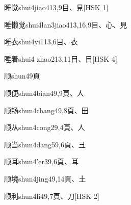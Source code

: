 \begin{entry}{睡觉}{shui4jiao4}{13,9}{⽬、⾒}[HSK 1]
\end{entry}

\begin{entry}{睡懒觉}{shui4lan3jiao4}{13,16,9}{⽬、⼼、⾒}
\end{entry}

\begin{entry}{睡衣}{shui4yi1}{13,6}{⽬、⾐}
\end{entry}

\begin{entry}{睡着}{shui4 zhao2}{13,11}{⽬、⽬}[HSK 4]
\end{entry}

\begin{entry}{顺}{shun4}{9}{⾴}
\end{entry}

\begin{entry}{顺便}{shun4bian4}{9,9}{⾴、⼈}
\end{entry}

\begin{entry}{顺畅}{shun4chang4}{9,8}{⾴、⽥}
\end{entry}

\begin{entry}{顺从}{shun4cong2}{9,4}{⾴、⼈}
\end{entry}

\begin{entry}{顺当}{shun4dang5}{9,6}{⾴、⼹}
\end{entry}

\begin{entry}{顺耳}{shun4'er3}{9,6}{⾴、⽿}
\end{entry}

\begin{entry}{顺境}{shun4jing4}{9,14}{⾴、⼟}
\end{entry}

\begin{entry}{顺利}{shun4li4}{9,7}{⾴、⼑}[HSK 2]
\end{entry}

